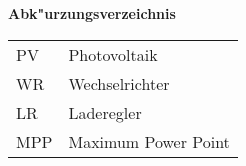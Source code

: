 \addtocounter{table}{-1} 
\bigskip
\Large \textsf{\textbf{Abk"urzungsverzeichnis}}
\begin{longtable}{p{2 cm}p{8 cm}} 
PV & Photovoltaik\\
WR & Wechselrichter \\
LR & Laderegler\\
MPP & Maximum Power Point\\
\end{longtable}